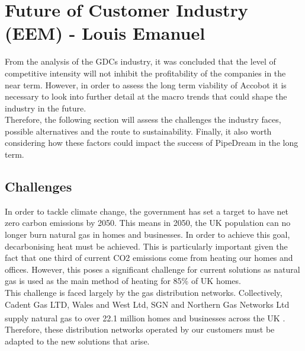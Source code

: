 \documentclass[11pt]{article}		%
\newcommand{\supercite}[1]{\textsuperscript{\cite{#1}}}		%
\begin{document}
        \section[Future of Customer Industry - EEM]{Future of Customer Industry (EEM) - Louis Emanuel}
		
    		From the analysis of the GDCs industry, it was concluded that the level of competitive intensity will not inhibit the profitability of the companies in the near term. However, in order to assess the long term viability of Accobot it is necessary to look into further detail at the macro trends that could shape the industry in the future.\\
    	    \hspace*{3ex}Therefore, the following section will assess the challenges the industry faces, possible alternatives and the route to sustainability. Finally, it also worth considering how these factors could impact the success of PipeDream in the long term. 
    	    
    	    \subsection[Challenges]{Challenges}
            In order to tackle climate change, the government has set a target to have net zero carbon emissions by 2050. This means in 2050, the UK population can no longer burn natural gas in homes and businesses. In order to achieve this goal, decarbonising heat must be achieved. This is particularly important given the fact that one third of current CO2 emissions come from heating our homes and offices. However, this poses a significant challenge for current solutions as natural gas is used as the main method of heating for 85\% of UK homes.\\
            \hspace*{3ex}This challenge is faced largely by the gas distribution networks. Collectively, Cadent Gas LTD, Wales and West Ltd, SGN and Northern Gas Networks Ltd supply natural gas to over 22.1 million homes and businesses across the UK \supercite{supplied}. Therefore, these distribution networks operated by our customers must be adapted to the new solutions that arise. 
    
\end{document}
